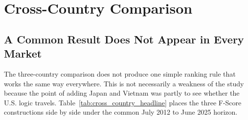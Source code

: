 \documentclass[11pt,a4paper]{report}
\numberwithin{figure}{chapter}
\numberwithin{table}{chapter}
\numberwithin{equation}{chapter}
\begin{document}
\chapter{Cross-Country Comparison}
\label{chap:crosscountry}

\section{A Common Result Does Not Appear in Every Market}

The three-country comparison does not produce one simple ranking rule that works the same way everywhere. This is not necessarily a weakness of the study because the point of adding Japan and Vietnam was partly to see whether the U.S. logic travels. Table~\ref{tab:cross_country_headline} places the three F-Score constructions side by side under the common July 2012 to June 2025 horizon.
\end{document}
